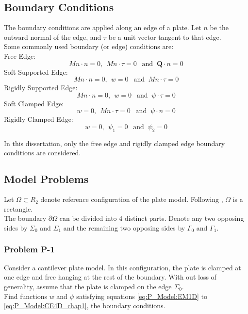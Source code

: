 \documentclass[../../main.tex]{subfiles}
\begin{document}
	\subsection{Boundary Conditions}\label{ssec:P_Model:BoundaryConditions}
	The boundary conditions are applied along an edge of a plate. Let $n$ be the outward normal of the edge, and $\tau$ be a unit vector tangent to that edge.\\
	
	Some commonly used boundary (or edge) conditions are:\\
	
	Free Edge:
	\[Mn\cdot n = 0, \ \ Mn\cdot \tau = 0 \ \ \textrm{ and }\ \mathbf{Q}\cdot n = 0 \]
	Soft Supported Edge:
	\[Mn\cdot n = 0, \ \ w = 0 \ \ \textrm{ and } \ Mn \cdot \tau = 0 \]
	Rigidly Supported Edge:
	\[Mn\cdot n = 0, \ \ w = 0 \ \ \textrm{ and } \ {\psi} \cdot \tau = 0 \]
	Soft Clamped Edge:
	\[w = 0, \ \ Mn \cdot \tau = 0 \ \ \textrm{ and } \ \psi \cdot n = 0 \]
	Rigidly Clamped Edge:
	\[w = 0, \ \ \psi_1 = 0 \ \ \textrm{ and } \ \psi_2 = 0 \]
	
	In this dissertation, only the free edge and rigidly clamped edge boundary conditions are considered.
	
	\subsection{Model Problems}\label{ssec:P_Model:ModelProblems}
	Let $\Omega \subset R_2$ denote reference configuration of the plate model. Following \cite{Wu05}, $\Omega$ is a rectangle.\\
	
	The boundary $\partial \Omega$ can be divided into 4 distinct parts. Denote any two opposing sides by $\Sigma_0$ and $\Sigma_1$ and the remaining two opposing sides by $\Gamma_0$ and $\Gamma_1$.
	
	\subsubsection{Problem P-1}\label{sssec:P_Model:ProblemP1}
	Consider a cantilever plate model. In this configuration, the plate is clamped at one edge and free hanging at the rest of the boundary. With out loss of generality, assume that the plate is clamped on the edge $\Sigma_0$.\\

	Find functions $w$ and $\psi$ satisfying equations \eqref{eq:P_Model:EM1D} to \eqref{eq:P_Model:CE4D_chap1}, the boundary conditions.\\
	
\end{document}
